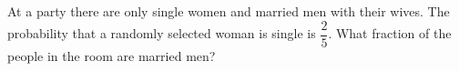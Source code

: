 At a party there are only single women and married men with their wives. The probability that a randomly selected woman is single is $\dfrac25$. What fraction of the people in the room are married men?
